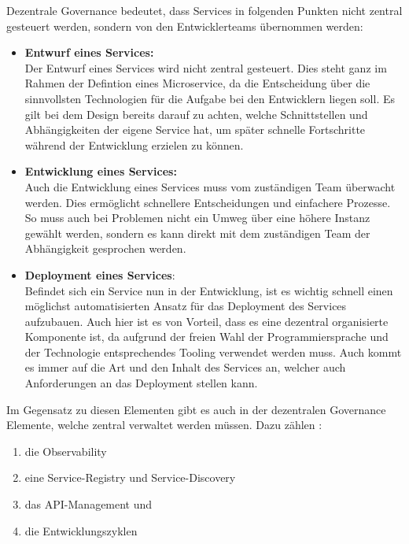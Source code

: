 \begin{definition}
	Dezentrale Governance bedeutet, dass Services in folgenden Punkten nicht zentral gesteuert werden, sondern von den Entwicklerteams übernommen werden:\autocites[S. 154]{microservice_enterprise} [Decentralized Governance]{FowlerMicrservices}
	
	\begin{itemize}
		\item \textbf{Entwurf eines Services:}\\
		Der Entwurf eines Services wird nicht zentral gesteuert. Dies steht ganz im Rahmen der Defintion eines Microservice, da die Entscheidung über die sinnvollsten Technologien für die Aufgabe bei den Entwicklern liegen soll. Es gilt bei dem Design bereits darauf zu achten, welche Schnittstellen und Abhängigkeiten der eigene Service hat, um später schnelle Fortschritte während der Entwicklung erzielen zu können.
		\item \textbf{Entwicklung eines Services:}\\
		Auch die Entwicklung eines Services muss vom zuständigen Team überwacht werden. Dies ermöglicht schnellere Entscheidungen und einfachere Prozesse. So muss auch bei Problemen nicht ein Umweg über eine höhere Instanz gewählt werden, sondern es kann direkt mit dem zuständigen Team der Abhängigkeit gesprochen werden.
		\item \textbf{Deployment eines Services}:\\
		Befindet sich ein Service nun in der Entwicklung, ist es wichtig schnell einen möglichst automatisierten Ansatz für das Deployment des Services aufzubauen. Auch hier ist es von Vorteil, dass es eine dezentral organisierte Komponente ist, da aufgrund der freien Wahl der Programmiersprache und der Technologie entsprechendes Tooling verwendet werden muss. Auch kommt es immer auf die Art und den Inhalt des Services an, welcher auch Anforderungen an das Deployment stellen kann.
	\end{itemize}
	Im Gegensatz zu diesen Elementen gibt es auch in der dezentralen Governance Elemente, welche zentral verwaltet werden müssen. Dazu zählen \autocite[S. 154]{microservice_enterprise}:

	\begin{enumerate}
		\item die Observability
		\item eine Service-Registry und Service-Discovery
		\item das API-Management und
		\item die Entwicklungszyklen
	\end{enumerate}

	
\end{definition}

